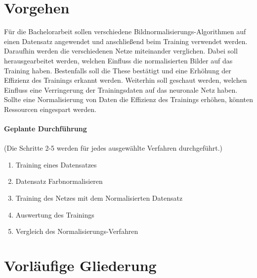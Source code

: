 \documentclass[a4paper,12pt,oneside]{article}
\begin{document}
  \section{Vorgehen}
  Für die Bachelorarbeit sollen verschiedene Bildnormalisierungs-Algorithmen auf einen 
  Datensatz angewendet und anschließend beim Training verwendet werden. Daraufhin 
  werden die verschiedenen Netze miteinander verglichen. Dabei soll herausgearbeitet werden, 
  welchen Einfluss die normalisierten Bilder auf das Training haben. Bestenfalls soll die These 
  bestätigt und eine Erhöhung der Effizienz des Trainings erkannt werden. 
  Weiterhin soll geschaut werden, welchen Einfluss eine Verringerung der Trainingsdaten auf das 
  neuronale Netz haben. Sollte eine Normalisierung von Daten die Effizienz des 
  Trainings erhöhen, könnten Ressourcen eingespart werden.\\\\
  \textbf{Geplante Durchführung}\\\\
  (Die Schritte 2-5 werden für jedes ausgewählte Verfahren durchgeführt.)
  \begin{enumerate}
  \item Training eines Datensatzes
  \item Datensatz Farbnormalisieren
  \item Training des Netzes mit dem Normalisierten Datensatz
  \item Auswertung des Trainings
  \item Vergleich des Normalisierungs-Verfahren
  \end{enumerate}
  
  \newpage
  
  \section{Vorläufige Gliederung}
  
\end{document}
